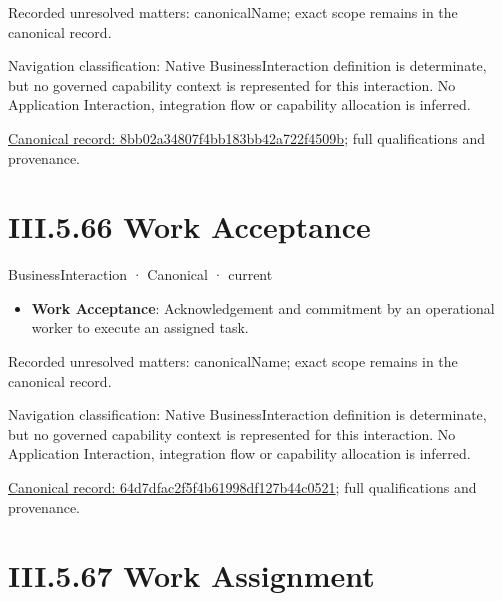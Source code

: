 {\small Recorded unresolved matters: canonicalName; exact scope remains in the canonical record.}\par
{\small Navigation classification: Native BusinessInteraction definition is determinate, but no governed capability context is represented for this interaction. No Application Interaction, integration flow or capability allocation is inferred.}\par
{\footnotesize \href{../../../../../../../continuum/business/business-interaction/8bb02a34807f4bb183bb42a722f4509b.md}{Canonical record: 8bb02a34807f4bb183bb42a722f4509b}; full qualifications and provenance.}\par
\section*{III.5.66 Work Acceptance}
\label{navigation:III.5.66}

\label{element:64d7dfac2f5f4b61998df127b44c0521}
{\small BusinessInteraction · Canonical · current}\par

\begin{itemize}


\item \textbf{Work Acceptance}: Acknowledgement and commitment by an operational worker to execute an assigned task.

\end{itemize}

{\small Recorded unresolved matters: canonicalName; exact scope remains in the canonical record.}\par
{\small Navigation classification: Native BusinessInteraction definition is determinate, but no governed capability context is represented for this interaction. No Application Interaction, integration flow or capability allocation is inferred.}\par
{\footnotesize \href{../../../../../../../continuum/business/business-interaction/64d7dfac2f5f4b61998df127b44c0521.md}{Canonical record: 64d7dfac2f5f4b61998df127b44c0521}; full qualifications and provenance.}\par
\section*{III.5.67 Work Assignment}
\label{navigation:III.5.67}

